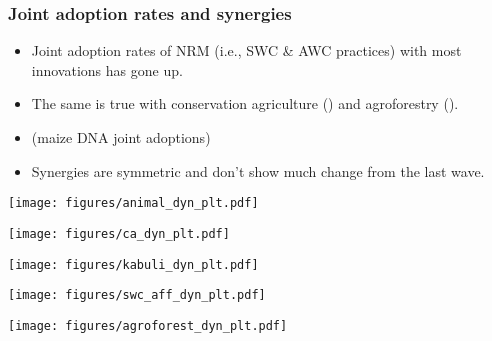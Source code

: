 \documentclass[11pt]{beamer}
\begin{document}
\begin{frame}
\label{frthpg}
\frametitle{Joint adoption rates and synergies}
\begin{itemize}

\item Joint adoption rates of NRM (i.e., SWC \& AWC practices) with most innovations has gone up. \hyperlink{nrmjointplt}{}

\item The same is true with conservation agriculture (\hyperlink{cajointplt}{}) and agroforestry (\hyperlink{agrfrstjointplt}{}). 

\item (maize DNA joint adoptions)

\item Synergies are symmetric and don't show much change from the last wave. \hyperlink{synergydyn}{}

\end{itemize}

\end{frame}



\begin{frame}
\label{animaldynplt}
\texttt{[image: figures/animal\_dyn\_plt.pdf]}
\hyperlink{frstpg}{}
\end{frame}


\begin{frame}
\label{cadynplt}
\texttt{[image: figures/ca\_dyn\_plt.pdf]}
\hyperlink{frstpg}{}
\end{frame}

\begin{frame}
\label{kabulidynplt}
\texttt{[image: figures/kabuli\_dyn\_plt.pdf]}
\hyperlink{frstpg}{}
\end{frame}

\begin{frame}
\label{swcaffdynplt}
\texttt{[image: figures/swc\_aff\_dyn\_plt.pdf]}
\hyperlink{frstpg}{}
\end{frame}

\begin{frame}
\label{agroforestdynplt}
\texttt{[image: figures/agroforest\_dyn\_plt.pdf]}
\hyperlink{frstpg}{}
\end{frame}
\end{document}
